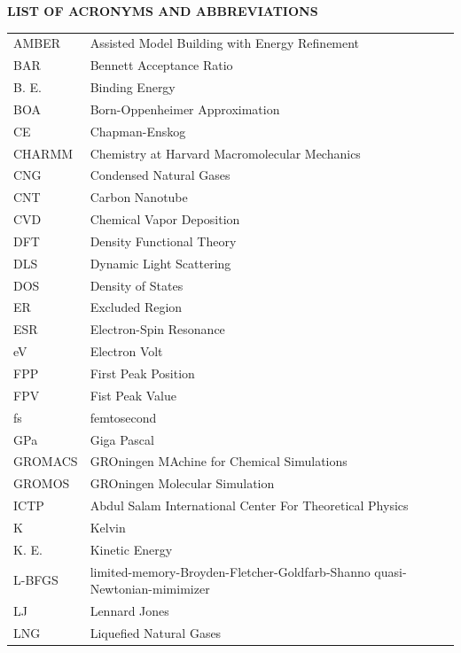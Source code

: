 \newpage
{}
{}
\begin{center}
{\Large\bf LIST OF ACRONYMS AND ABBREVIATIONS}
\end{center}
\vspace{1cm}
\begin{tabular}{l p{10cm}}

AMBER    & Assisted Model Building with Energy Refinement\\
BAR      & Bennett Acceptance Ratio\\
B. E.    & Binding Energy \\
BOA      & Born-Oppenheimer Approximation \\
CE       & Chapman-Enskog\\
CHARMM   & Chemistry at Harvard Macromolecular Mechanics\\
CNG      & Condensed Natural Gases \\
CNT      & Carbon Nanotube \\
CVD      & Chemical Vapor Deposition \\
DFT      & Density Functional Theory \\
DLS      & Dynamic Light Scattering \\
DOS      & Density of States \\
ER       & Excluded Region \\
ESR      & Electron-Spin Resonance\\
eV       & Electron Volt \\
FPP      & First Peak Position\\
FPV      & Fist Peak Value \\
fs       & femtosecond\\
GPa      & Giga Pascal \\
GROMACS  & GROningen MAchine for Chemical Simulations \\
GROMOS   & GROningen Molecular Simulation \\
ICTP    & Abdul Salam International Center For Theoretical Physics \\
 K      & Kelvin \\
K. E.   & Kinetic Energy \\
L-BFGS  & limited-memory-Broyden-Fletcher-Goldfarb-Shanno quasi-Newtonian-mimimizer \\
LJ      & Lennard Jones\\ 
LNG     & Liquefied Natural Gases \\

\end{tabular}
